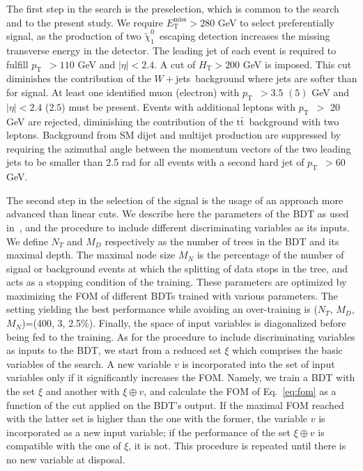 \documentclass{article}
\newcommand{\pt}{\ensuremath{p_{\mathrm{T}}}~}
\newcommand{\met}{\ensuremath{E_\mathrm{T}^\mathrm{miss}}}
\newcommand{\Ht}{\ensuremath{H_{\mathrm{T}}}}
\newcommand{\wjets}{\ensuremath{W+}jets~}
\newcommand{\ttbar}{\ensuremath{\mathrm{t}\bar{\mathrm{t}}}~}
\newcommand{\lsp}{\ensuremath{\tilde{\chi}_{1}^{0}}~}
\begin{document}
The first step in the search is the preselection, which is common to the 
search~\cite{st4bd} and to the present study. We require \met$>280$ GeV to 
select preferentially signal, as the production of two \lsp escaping 
detection increases the missing transverse energy in the detector. The 
leading jet of each event is required to fulfill \pt$>110$ GeV and 
$|\eta|<2.4$. A cut of \Ht$>200$ GeV is imposed. This cut diminishes the 
contribution of the \wjets background where jets are softer than for 
signal. At least one identified muon (electron) with \pt $>3.5$ $(5)$ GeV 
and $|\eta|<2.4$ ($2.5$) must be present. Events with additional leptons 
with \pt $>$ 20 GeV are rejected, diminishing the contribution of the 
\ttbar background with two leptons. Background from SM dijet and multijet 
production are suppressed by requiring the azimuthal angle between the 
momentum vectors of the two leading jets to be smaller than 2.5 rad for 
all events with a second hard jet of \pt$>60$ GeV.

The second step in the selection of the signal is the usage of an approach 
more advanced than linear cuts. We describe here the parameters of the BDT 
as used in~\cite{st4bd}, and the procedure to include different 
discriminating variables as its inputs. We define $N_T$ and $M_D$ 
respectively as the number of trees in the BDT and its maximal depth. The 
maximal node size $M_N$ is the percentage of the number of signal or 
background events at which the splitting of data stops in the tree, and 
acts as a stopping condition of the training. These parameters are 
optimized by maximizing the FOM of different BDTs trained with various 
parameters. The setting yielding the best performance while avoiding an 
over-training is ($N_T$, $M_D$, $M_N$)=(400, 3, 2.5\%). Finally, the space 
of input variables is diagonalized before being fed to the training. As 
for the procedure to include discriminating variables as inputs to the 
BDT, we start from a reduced set $\xi$ which comprises the basic variables 
of the search. A new variable $v$ is incorporated into the set of input 
variables only if it significantly increases the FOM. Namely, we train a 
BDT with the set $\xi$ and another with $\xi \oplus v$, and calculate the 
FOM of Eq.~\ref{eq:fom} as a function of the cut applied on the BDT's 
output. If the maximal FOM reached with the latter set is higher than the 
one with the former, the variable $v$ is incorporated as a new input 
variable; if the performance of the set $\xi \oplus v$ is compatible with 
the one of $\xi$, it is not. This procedure is repeated until there is no 
new variable at disposal.
\end{document}
